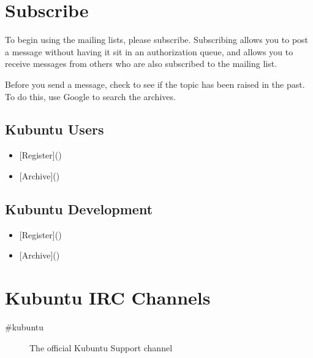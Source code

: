 \documentclass[letterpaper,10pt,english]{sphinxmanual}
\begin{document}
\section{Subscribe}
\label{\detokenize{docs/contribute:subscribe}}
\sphinxAtStartPar
To begin using the mailing lists, please subscribe. Subscribing allows you to post a message without having it sit in an authorization queue, and allows you to receive messages from others who are also subscribed to the mailing list.

\sphinxAtStartPar
Before you send a message, check to see if the topic has been raised in the past. To do this, use Google to search the archives.


\subsection{Kubuntu Users}
\label{\detokenize{docs/contribute:kubuntu-users}}\begin{itemize}
\item {} 
\sphinxAtStartPar
{[}Register{]}()

\item {} 
\sphinxAtStartPar
{[}Archive{]}()

\end{itemize}


\subsection{Kubuntu Development}
\label{\detokenize{docs/contribute:kubuntu-development}}\begin{itemize}
\item {} 
\sphinxAtStartPar
{[}Register{]}()

\item {} 
\sphinxAtStartPar
{[}Archive{]}()

\end{itemize}


\section{Kubuntu IRC Channels}
\label{\detokenize{docs/contribute:kubuntu-irc-channels}}\begin{description}
\item[{\#kubuntu}] \leavevmode
\sphinxAtStartPar
The official Kubuntu Support channel

\end{description}
\end{document}
